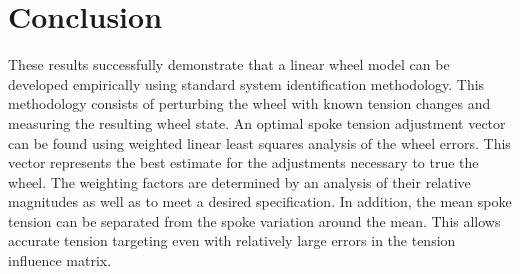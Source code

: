 \documentclass[journal]{IEEEtran}
\begin{document}
%



\section{Conclusion}
These results successfully demonstrate that a linear wheel model can be developed empirically using standard system identification methodology.  This methodology consists of perturbing the wheel with known tension changes and measuring the resulting wheel state.  An optimal spoke tension adjustment vector can be found using weighted linear least squares analysis of the wheel errors.  This vector represents the best estimate for the adjustments  necessary to true the wheel. The weighting factors are determined by an analysis of their relative magnitudes as well as to meet a desired specification. In addition, the mean spoke tension can be separated from the spoke variation around the mean.  This allows accurate tension targeting even with relatively large errors in the tension influence matrix.
\end{document}
